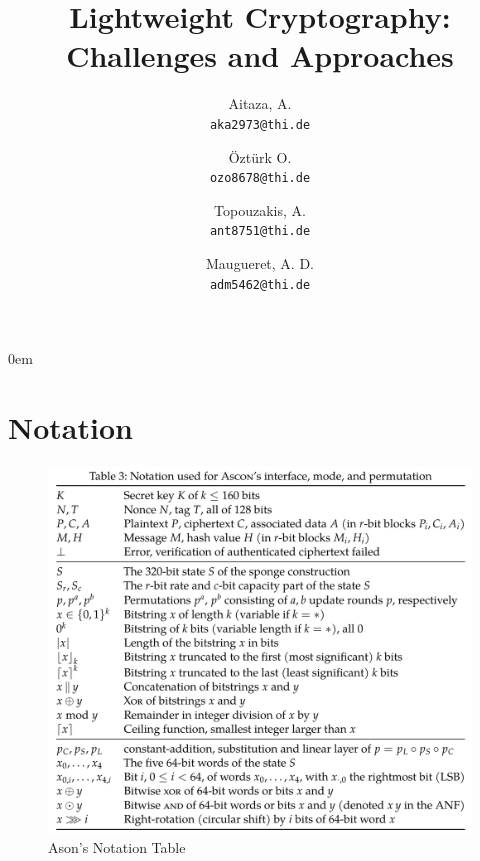 \documentclass[a4paper]{article}
\begin{document}
\begin{titlepage}

  \title{ \Huge Lightweight Cryptography: Challenges and Approaches}
  \author{
    Aitaza, A. \\
    \texttt{aka2973@thi.de}
    \and
    Öztürk O.\\
    \texttt{ozo8678@thi.de}   
    \and
    Topouzakis, A. \\
    \texttt{ant8751@thi.de}
    \and
    Maugueret, A. D.\\
    \texttt{adm5462@thi.de}
    }
  \clearpage\maketitle
  \thispagestyle{empty}

\end{titlepage}

\restoregeometry

\newpage
\tableofcontents
\newpage
\listoffigures
\newpage
{} 

\topmargin-20mm
\hoffset-15mm
\textwidth15.5cm
\parindent0em

\thispagestyle{empty}
\section{Notation}

\begin{figure}[H] 
    \centering 
    \includegraphics[width=1\textwidth]{figures/ascon-notation.png}
    \caption{Ason's Notation Table \cite{DBLP:journals/joc/DobraunigEMS21}}
    \label{fig:ascon-notation} 
  \end{figure}








\newpage
\printbibliography
\newpage


\end{document}
